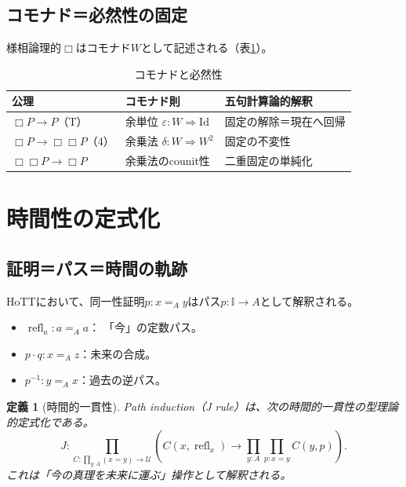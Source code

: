 \documentclass[11pt,a4paper]{ltjsarticle}
\newtheorem{definition}{定義}[section]
\theoremstyle{remark}
\newcommand{\Id}{\mathrm{Id}}
\begin{document}
\subsection{コモナド＝必然性の固定}

様相論理的$\Box$はコモナド$W$として記述される（表\ref{tab:comonad}）。

\begin{table}[htbp]
\centering
\caption{コモナドと必然性}
\label{tab:comonad}
\small
\begin{tabularx}{\textwidth}{@{}>{\raggedright\arraybackslash}X >{\raggedright\arraybackslash}X >{\raggedright\arraybackslash}X@{}}
\toprule
公理 & コモナド則 & 五句計算論的解釈 \\
\midrule
$\Box P\to P$（T） & 余単位 $\varepsilon:W\Rightarrow\Id$ & 固定の解除＝現在へ回帰 \\
$\Box P\to\Box\Box P$（4） & 余乗法 $\delta:W\Rightarrow W^2$ & 固定の不変性 \\
$\Box\Box P\to\Box P$ & 余乗法のcounit性 & 二重固定の単純化 \\
\bottomrule
\end{tabularx}
\end{table}

\section{時間性の定式化}

\subsection{証明＝パス＝時間の軌跡}

HoTTにおいて、同一性証明$p:x=_Ay$はパス$p:\mathbb{I}\to A$として解釈される。
\begin{itemize}
  \item $\operatorname{refl}_a:a=_Aa$： 「今」の定数パス。
  \item $p\mathbin{\cdot}q:x=_Az$：未来の合成。
  \item $p^{-1}:y=_Ax$：過去の逆パス。
\end{itemize}

\begin{definition}[時間的一貫性]
Path induction（J rule）は、次の時間的一貫性の型理論的定式化である。
\[
J:\prod_{C:\prod_{y:A}(x=y)\to\mathcal{U}}
\left(C(x,\operatorname{refl}_x)\to
\prod_{y:A}\prod_{p:x=y}C(y,p)\right).
\]
これは「今の真理を未来に運ぶ」操作として解釈される。
\end{definition}
\end{document}
